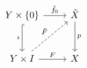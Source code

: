 \documentclass{article}
\begin{document}
    \begin{equation*}
        \begin{tikzcd}[row sep=0.4in]
            Y\times\l\{0\r\} \ar[r, "\tilde{f}_0"] \ar[d, "\iota"', hookrightarrow] & \tilde{X} \ar[d, "p"] \\
            Y\times I \ar[r, "F"] \ar[ur, "\tilde{F}", dashed] & X
        \end{tikzcd}
    \end{equation*}
\end{document}
